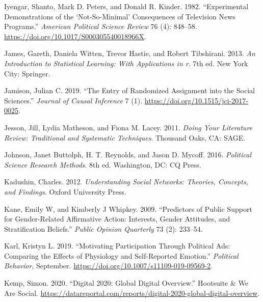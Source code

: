 \documentclass{book}
\newlength{\cslhangindent}
\newlength{\cslentryspacingunit} %
\newenvironment{CSLReferences}[2] %
 {%
  \setlength{\parindent}{0pt}
  \ifodd #1
  \let\oldpar\par
  \def\par{\hangindent=\cslhangindent\oldpar}
  \fi
  \setlength{\parskip}{#2\cslentryspacingunit}
 }%
 {}
\begin{document}
\begin{CSLReferences}{1}{0}
\leavevmode{}%
Iyengar, Shanto, Mark D. Peters, and Donald R. Kinder. 1982. {``Experimental
{Demonstrations} of the {`{Not}-{So}-{Minimal}'} {Consequences} of
{Television} {News} {Programs}.''} \emph{American Political Science Review} 76
(4): 848--58. \url{https://doi.org/10.1017/S000305540018966X}.

\leavevmode{}%
James, Gareth, Daniela Witten, Trevor Hastie, and Robert Tibshirani. 2013.
\emph{\emph{An Introduction to Statistical Learning: With Applications in r}}.
7th ed. New York City: Springer.

\leavevmode{}%
Jamison, Julian C. 2019. {``The {Entry} of {Randomized} {Assignment} into the
{Social} {Sciences}.''} \emph{Journal of Causal Inference} 7 (1).
\url{https://doi.org/10.1515/jci-2017-0025}.

\leavevmode{}%
Jesson, Jill, Lydia Matheson, and Fiona M. Lacey. 2011. \emph{Doing {Your
Literature Review}: {Traditional} and {Systematic Techniques}}. Thousand Oaks,
CA: {SAGE}.

\leavevmode{}%
Johnson, Janet Buttolph, H. T. Reynolds, and Jason D. Mycoff. 2016.
\emph{Political {Science Research Methods}}. 8th ed. Washington, DC: {CQ
Press}.

\leavevmode{}%
Kadushin, Charles. 2012. \emph{Understanding Social Networks: Theories,
Concepts, and Findings}. Oxford University Press.

\leavevmode{}%
Kane, Emily W, and Kimberly J Whipkey. 2009. {``Predictors of Public Support
for Gender-Related Affirmative Action: Interests, Gender Attitudes, and
Stratification Beliefs.''} \emph{Public Opinion Quarterly} 73 (2): 233--54.

\leavevmode{}%
Karl, Kristyn L. 2019. {``Motivating Participation Through Political Ads:
Comparing the Effects of Physiology and Self-Reported Emotion.''}
\emph{Political Behavior}, September.
\url{https://doi.org/10.1007/s11109-019-09569-2}.

\leavevmode{}%
Kemp, Simon. 2020. {``Digital 2020: Global Digital Overview.''} Hootsuite \&
We Are Social.
\url{https://datareportal.com/reports/digital-2020-global-digital-overview}.


\end{CSLReferences}
\end{document}

